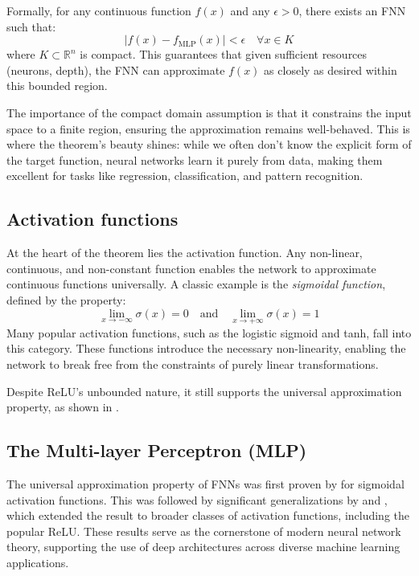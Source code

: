 \documentclass{article}
\theoremstyle{definition}
\theoremstyle{remark}
\begin{document}
Formally, for any continuous function \(f(x)\) and any \(\epsilon > 0\), there exists an FNN such that:
\[
| f(x) - f_{\text{MLP}}(x) | < \epsilon \quad \forall x \in K
\]
where \(K \subset \mathbb{R}^n\) is compact. This guarantees that given sufficient resources (neurons, depth), the FNN can approximate \(f(x)\) as closely as desired within this bounded region.

The importance of the compact domain assumption is that it constrains the input space to a finite region, ensuring the approximation remains well-behaved.
This is where the theorem’s beauty shines: while we often don’t know the explicit form of the target function, neural networks learn it purely from data, making them excellent for tasks like regression, classification, and pattern recognition.



\subsection{Activation functions} %
At the heart of the theorem lies the activation function. Any non-linear, continuous, and non-constant function enables the network to approximate continuous functions universally.
A classic example is the \textit{sigmoidal function}, defined by the property:
\[
\lim_{x \to -\infty} \sigma(x) = 0 \quad \text{and} \quad \lim_{x \to +\infty} \sigma(x) = 1
\]
Many popular activation functions, such as the logistic sigmoid and tanh, fall into this category.
These functions introduce the necessary non-linearity, enabling the network to break free from the constraints of purely linear transformations.

Despite ReLU's unbounded nature, it still supports the universal approximation property, as shown in \citep{yarotsky2017error}.



\subsection{The Multi-layer Perceptron (MLP)}

The universal approximation property of FNNs was first proven by \citep{cybenko1989approximation} for sigmoidal activation functions. This was followed by significant generalizations by \citep{hornik1989multilayer} and \citep{funahashi1989approximate}, which extended the result to broader classes of activation functions, including the popular ReLU.
These results serve as the cornerstone of modern neural network theory, supporting the use of deep architectures across diverse machine learning applications.
\end{document}
